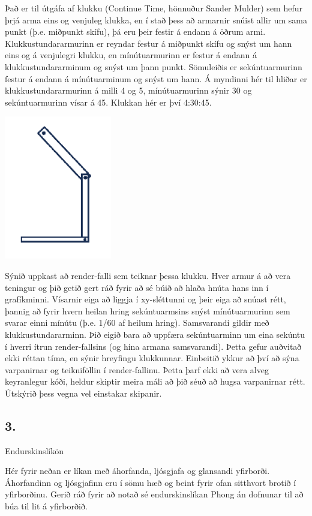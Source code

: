 \documentclass{article}
\begin{document}
Það er til útgáfa af klukku (Continue Time, hönnuður Sander Mulder) sem hefur
þrjá arma eins og venjuleg klukka, en í stað þess að armarnir
snúist allir um sama punkt (þ.e. miðpunkt skífu), þá eru þeir
festir á endann á öðrum armi. Klukkustundararmurinn er
reyndar festur á miðpunkt skífu og snýst um hann eins og á
venjulegri klukku, en mínútuarmurinn er festur á endann á
klukkustundararminum og snýst um þann punkt. Sömuleiðis
er sekúntuarmurinn festur á endann á mínútuarminum og
snýst um hann. Á myndinni hér til hliðar er
klukkustundararmurinn á milli 4 og 5, mínútuarmurinn sýnir
30 og sekúntuarmurinn vísar á 45. Klukkan hér er því
4:30:45.

\includegraphics[scale = 0.9]{klukka.png}

Sýnið uppkast að render-falli sem teiknar þessa klukku. Hver armur á að vera
teningur og þið getið gert ráð fyrir að sé búið að hlaða hnúta hans inn í
grafíkminni. Vísarnir eiga að liggja í xy-sléttunni og þeir eiga að snúast rétt,
þannig að fyrir hvern heilan hring sekúntuarmsins snýst mínútuarmurinn sem
svarar einni mínútu (þ.e. 1/60 af heilum hring). Samsvarandi gildir með
klukkustundararminn. Þið eigið bara að uppfæra sekúntuarminn um eina sekúntu í
hverri ítrun render-fallsins (og hina armana samsvarandi). Þetta gefur auðvitað
ekki réttan tíma, en sýnir hreyfingu klukkunnar.
Einbeitið ykkur að því að sýna varpanirnar og teikniföllin í render-fallinu. Þetta
þarf ekki að vera alveg keyranlegur kóði, heldur skiptir meira máli að þið séuð að
hugsa varpanirnar rétt. Útskýrið þess vegna vel einstakar skipanir.

\newpage

\subsection{3.} Endurskinslíkön

Hér fyrir neðan er líkan með áhorfanda, ljósgjafa og glansandi yfirborði.
Áhorfandinn og ljósgjafinn eru í sömu hæð og beint fyrir ofan sitthvort brotið í
yfirborðinu. Gerið ráð fyrir að notað sé endurskinslíkan Phong án dofnunar til að
búa til lit á yfirborðið.
\end{document}
